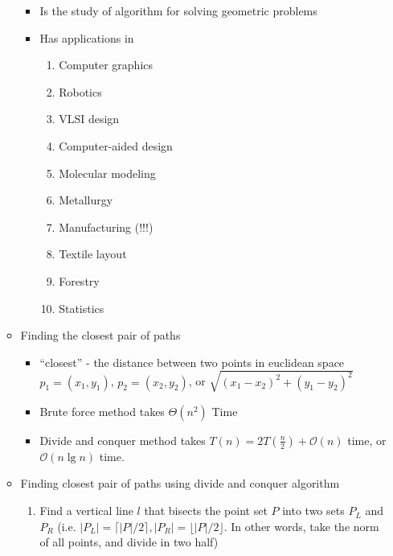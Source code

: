 \documentclass[12pt]{article}
\begin{document}
\begin{enumerate}[1.]
\begin{itemize}
        \begin{itemize}
            \item Is the study of algorithm for solving geometric problems
            \item Has applications in

            \begin{enumerate}[1.]
                \item Computer graphics
                \item Robotics
                \item VLSI design
                \item Computer-aided design
                \item Molecular modeling
                \item Metallurgy
                \item Manufacturing (!!!)
                \item Textile layout
                \item Forestry
                \item Statistics
            \end{enumerate}
        \end{itemize}

        \item Finding the closest pair of paths

        \begin{itemize}
            \item ``closest'' - the distance between two points in euclidean space $p_1 = (x_1, y_1)$, $p_2 = (x_2, y_2)$, or
            $\sqrt{(x_1 - x_2)^2 + (y_1 - y_2)^2}$
            \item Brute force method takes $\Theta(n^2 )$ Time
            \item Divide and conquer method takes $T(n) = 2T(\frac{n}{2}) + \mathcal{O}(n)$ time, or $\mathcal{O}(n\lg n)$ time.
        \end{itemize}

        \item Finding closest pair of paths using divide and conquer algorithm

        \begin{enumerate}[1.]
            \item Find a vertical line $l$ that bisects the point set $P$ into two
            sets $P_L$ and $P_R$ (i.e. $\lvert P_L \rvert = \lceil \lvert P \rvert / 2 \rceil, \lvert P_R \rvert = \lfloor \lvert P \rvert /2 \rfloor$.
            In other words, take the norm of all points, and divide in two half)
        \end{enumerate}
    \end{itemize}


\end{enumerate}
\end{document}
